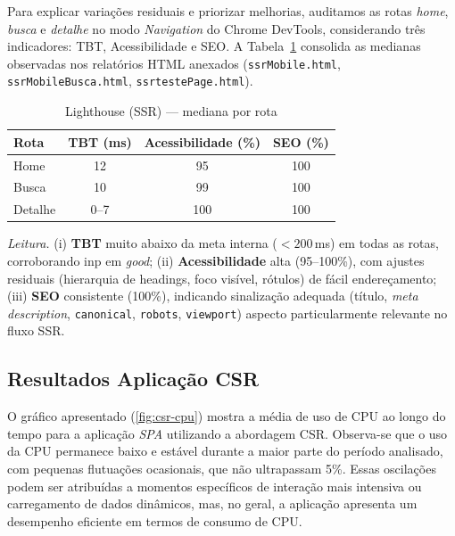 {Para explicar variações residuais e priorizar melhorias, auditamos as rotas \emph{home}, \emph{busca} e \emph{detalhe} no modo \emph{Navigation} do Chrome DevTools, considerando três indicadores: TBT, Acessibilidade e SEO. A Tabela~\ref{tab:lh-ssr} consolida as medianas observadas nos relatórios HTML anexados (\texttt{ssrMobile.html}, \texttt{ssrMobileBusca.html}, \texttt{ssrtestePage.html}).

\begin{table}[H]
\centering
\caption{Lighthouse (SSR) — mediana por rota}
\label{tab:lh-ssr}
\begin{tabular}{|l|c|c|c|}
\hline
\textbf{Rota} & \textbf{TBT (ms)} & \textbf{Acessibilidade (\%)} & \textbf{SEO (\%)} \\
\hline
Home    & 12 & 95  & 100 \\
Busca   & 10 & 99  & 100 \\
Detalhe & 0--7\footnotemark[1] & 100 & 100 \\
\hline
\end{tabular}
\end{table}

\noindent \textit{Leitura.}
(i) \textbf{TBT} muito abaixo da meta interna ($<200$\,ms) em todas as rotas, corroborando \acrshort{inp} em \textit{good};
(ii) \textbf{Acessibilidade} alta (95--100\%), com ajustes residuais (hierarquia de headings, foco visível, rótulos) de fácil endereçamento;
(iii) \textbf{SEO} consistente (100\%), indicando sinalização adequada (título, \emph{meta description}, \texttt{canonical}, \texttt{robots}, \texttt{viewport}) aspecto particularmente relevante no fluxo SSR.

\subsection{Resultados Aplicação CSR}
\label{subsec:resultados-csr}

O gráfico apresentado (\autoref{fig:csr-cpu}) mostra a média de uso de CPU ao longo do tempo para a aplicação \emph{SPA} utilizando a abordagem CSR. Observa-se que o uso da CPU permanece baixo e estável durante a maior parte do período analisado, com pequenas flutuações ocasionais, que não ultrapassam 5\%. Essas oscilações podem ser atribuídas a momentos específicos de interação mais intensiva ou carregamento de dados dinâmicos, mas, no geral, a aplicação apresenta um desempenho eficiente em termos de consumo de CPU.

}
